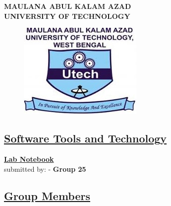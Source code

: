 \documentclass{article}
\begin{document}

\begin{center}
    \huge\textbf{MAULANA ABUL KALAM AZAD \\ \vspace{0.5cm}UNIVERSITY OF TECHNOLOGY}\\
    \vspace{0.5 cm}{MAKAUT WB}

\end{center}
\begin{figure}[h!]
    \centering
    \includegraphics[width=0.3\linewidth]{MAKAUT_LOGO.jpg}
\end{figure}
\date{\today} 
\begin{center}
    \section*{\textbf{\underline{Software Tools and Technology}}}
    \vspace{0.5cm}
    \textbf{\underline{\large{Lab Notebook}}} \\
    \vspace{0.5cm}
    \LARGE submitted by: - \textbf{Group 25}
\end{center}
\begin{center}
\section*{\textbf{\underline{Group Members}}}
\end{center}
\vspace{0.2 cm}
\end{document}
